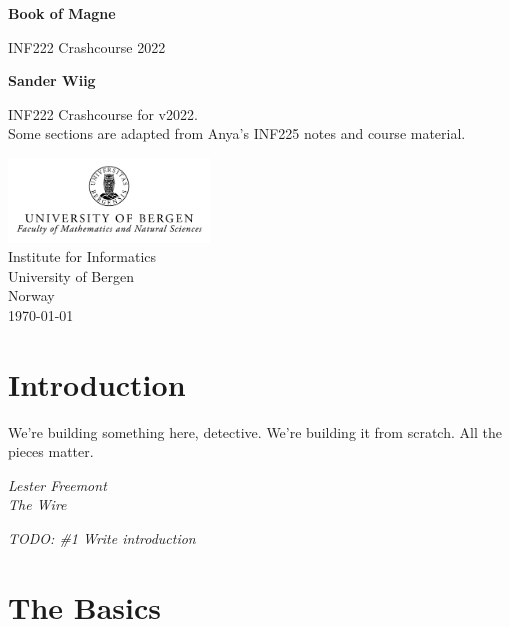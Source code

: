 \documentclass[tikz, border=5mm]{article}
\DeclareRobustCommand{\comment}[1]{
    {\color{orange}\emph{#1}}
}
\begin{document}
    \begin{titlepage}
        \begin{center}
            \vspace*{1cm}
    
            \huge
            \textbf{Book of Magne}
    
            \vspace{0.5cm}
            \LARGE
            INF222 Crashcourse 2022
                
            \vspace{1.5cm}

            \textbf{Sander Wiig}
    
            \vfill
            
            \Large
            INF222 Crashcourse for v2022.\\
            Some sections are adapted from Anya's INF225 notes and course material.
                
            \vspace{0.5cm}
        
            \includegraphics[width=0.4\textwidth]{UiBlogoMN_gray_m_Eng.png}\\
            \Large
            Institute for Informatics\\
            University of Bergen\\
            Norway\\
            \today
                
        \end{center}
    \end{titlepage}
    \newpage
    \tableofcontents
    \newpage
    \section{Introduction}
    \epigraph{We're building something here, detective. We're building it from scratch. All the pieces matter.}{\textit{Lester Freemont \\ The Wire}}
    \comment{TODO: \#1 Write introduction}
    \section{The Basics}
\end{document}
